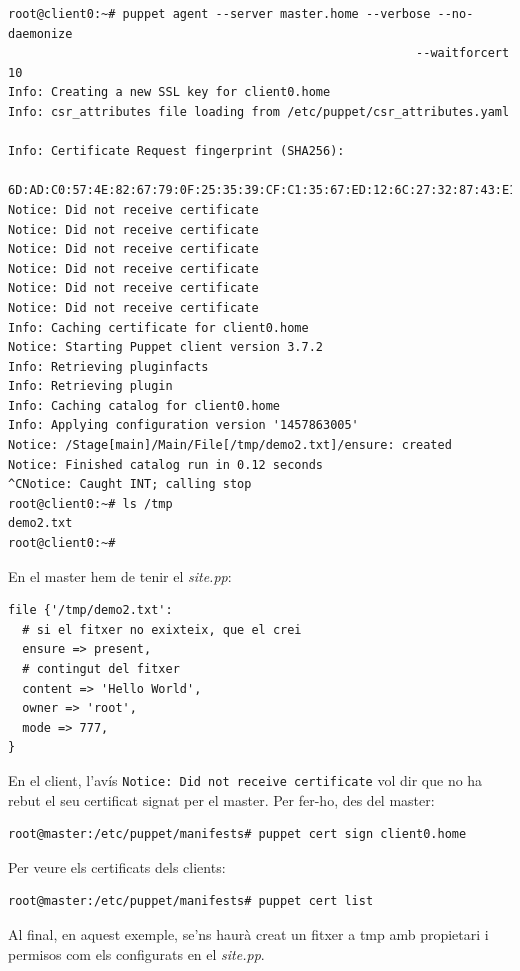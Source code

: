 \documentclass[a4paper]{article}
\begin{document}
\begin{verbatim}
root@client0:~# puppet agent --server master.home --verbose --no-daemonize 
														 --waitforcert 10
Info: Creating a new SSL key for client0.home
Info: csr_attributes file loading from /etc/puppet/csr_attributes.yaml

Info: Certificate Request fingerprint (SHA256): 
  6D:AD:C0:57:4E:82:67:79:0F:25:35:39:CF:C1:35:67:ED:12:6C:27:32:87:43:E1:...
Notice: Did not receive certificate
Notice: Did not receive certificate
Notice: Did not receive certificate
Notice: Did not receive certificate
Notice: Did not receive certificate
Notice: Did not receive certificate
Info: Caching certificate for client0.home
Notice: Starting Puppet client version 3.7.2
Info: Retrieving pluginfacts
Info: Retrieving plugin
Info: Caching catalog for client0.home
Info: Applying configuration version '1457863005'
Notice: /Stage[main]/Main/File[/tmp/demo2.txt]/ensure: created
Notice: Finished catalog run in 0.12 seconds
^CNotice: Caught INT; calling stop
root@client0:~# ls /tmp
demo2.txt
root@client0:~# 
\end{verbatim}
En el master hem de tenir el \textit{site.pp}:
\begin{verbatim}
file {'/tmp/demo2.txt':
  # si el fitxer no exixteix, que el crei
  ensure => present,
  # contingut del fitxer
  content => 'Hello World',
  owner => 'root',
  mode => 777,
}
\end{verbatim}
En el client, l'avís \verb+Notice: Did not receive certificate+ vol dir que no ha rebut el seu certificat signat per el master. Per fer-ho, des del master:
\begin{verbatim}
root@master:/etc/puppet/manifests# puppet cert sign client0.home
\end{verbatim}
Per veure els certificats dels clients:
\begin{verbatim}
root@master:/etc/puppet/manifests# puppet cert list
\end{verbatim}
Al final, en aquest exemple, se'ns haurà creat un fitxer a tmp amb propietari i permisos com els configurats en el \textit{site.pp}.
\end{document}
